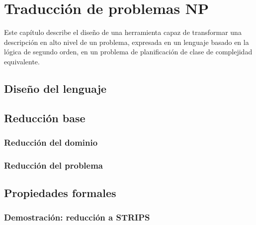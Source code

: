 
\chapter{Traducción de problemas NP}
\label{Chapter2}
Este capítulo describe el diseño de una herramienta capaz de transformar una
descripción en alto nivel de un problema, expresada en un lenguaje basado en la
lógica de segundo orden, en un problema de planificación de clase de
complejidad equivalente.

\section{Diseño del lenguaje}


\section{Reducción base}
\subsection{Reducción del dominio}
\subsection{Reducción del problema}

\section{Propiedades formales}
\subsection{Demostración: reducción a STRIPS}
